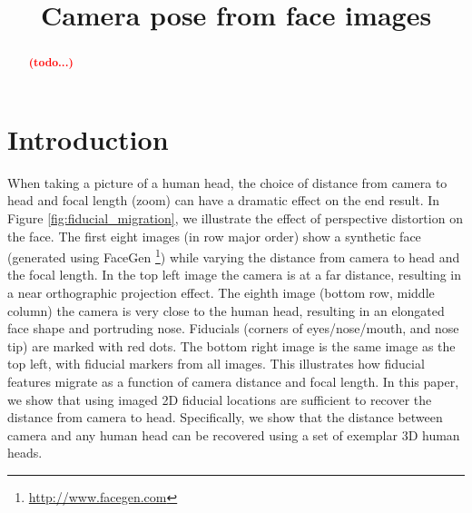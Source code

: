 \documentclass[runningheads]{llncs}
\newcommand {\afbnote} [1] {{\bf \textcolor{red}{(#1)}}}
\begin{document}
\pagestyle{headings}

\mainmatter

\title{Camera pose from face images}


\maketitle

\begin{abstract}
\afbnote{todo...}
\end{abstract}

\section{Introduction}
When taking a picture of a human head, the choice of distance from camera to head and focal length (zoom) can have a dramatic effect on the end result.  
In Figure \ref{fig:fiducial_migration}, we illustrate the effect of perspective distortion on the face. 
The first eight images (in row major order) show a synthetic face (generated using FaceGen \footnote{\url{http://www.facegen.com}}) while varying the distance from camera to head and the focal length.  
In the top left image the camera is at a far distance, resulting in a near orthographic projection effect.  
The eighth image (bottom row, middle column) the camera is very close to the human head, resulting in an elongated face shape and portruding nose.  
Fiducials (corners of eyes/nose/mouth, and nose tip) are marked with red dots.  
The bottom right image is the same image as the top left, with fiducial markers from all images.
This illustrates how fiducial features migrate as a function of camera distance and focal length. 
In this paper, we show that using imaged 2D fiducial locations are sufficient to recover the distance from camera to head. 
Specifically, we show that the distance between camera and any human head can be recovered using a set of exemplar 3D human heads.
\end{document}
